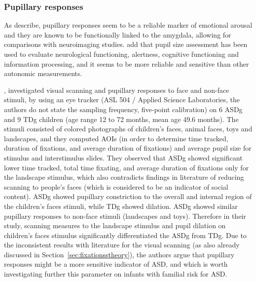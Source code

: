 \subsubsection{Pupillary responses}
\label{sec:pupillaryresponses}

As \cite{nuske2014pupil} describe, pupillary responses seem to be a reliable marker of emotional arousal and they are known to be functionally linked to the amygdala, allowing for comparisons with neuroimaging studies. \cite{martineau2011pupil} add that pupil size assessment has been used to evaluate neurological functioning, alertness, cognitive functioning and information processing, and it seems to be more reliable and sensitive than other autonomic measurements.

\cite{anderson2006visualscanning}, investigated visual scanning and pupillary responses to face and non-face stimuli, by using an eye tracker (ASL 504 / Applied Science Laboratories, the authors do not state the sampling frequency, five-point calibration) on 6 ASDg and 9 TDg children (age range 12 to 72 months, mean age 49.6 months). The stimuli consisted of colored photographs of children’s faces, animal faces, toys and landscapes, and they computed AOIs (in order to determine time tracked, duration of fixations, and average duration of fixations) and average pupil size for stimulus and interstimulus slides. They observed that ASDg showed significant lower time tracked, total time fixating, and average duration of fixations only for the landscape stimulus, which also contradicts findings in literature of reducing scanning to people’s faces (which is considered to be an indicator of social content). ASDg showed pupillary constriction to the overall and internal region of the children’s faces stimuli, while TDg showed dilation. ASDg showed similar pupillary responses to non-face stimuli (landscapes and toys). Therefore in their study, scanning measures to the landscape stimulus and pupil dilation on children’s faces stimulus significantly differentiated the ASDg from TDg. Due to the inconsistent results with literature for the visual scanning (as also already discussed in Section~\ref{sec:fixationsstheory}), the authors argue that pupillary responses might be a more sensitive indicator of ASD, and which is worth investigating further this parameter on infants with familial risk for ASD.

